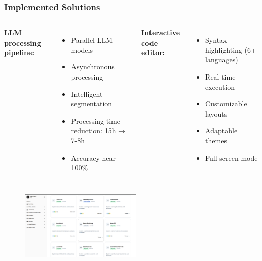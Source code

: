 \documentclass{beamer}
\begin{document}
\begin{frame}
\frametitle{Implemented Solutions}
\begin{columns}
\textbf{LLM processing pipeline:}
\begin{itemize}
    \item Parallel LLM models
    \item Asynchronous processing
    \item Intelligent segmentation
    \item Processing time reduction: 15h → 7-8h
    \item Accuracy near 100\%
\end{itemize}

\textbf{Interactive code editor:}
\begin{itemize}
    \item Syntax highlighting (6+ languages)
    \item Real-time execution
    \item Customizable layouts
    \item Adaptable themes
    \item Full-screen mode
\end{itemize}
\end{columns}

\vspace{0.3cm}
\begin{center}
    \includegraphics[width=0.6\textwidth,height=3.3cm,keepaspectratio]{week_3_img/Screenshot 2025-05-20 164411.png}
\end{center}
\end{frame}
\end{document}
